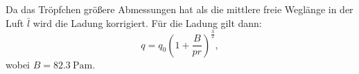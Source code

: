 Da das Tröpfchen größere Abmessungen hat als die mittlere
freie Weglänge in der Luft $\bar{l}$ wird die Ladung korrigiert.
Für die Ladung gilt dann:
\begin{equation}
  q = q_0 \left( 1 + \frac{B}{p r} \right)^{\frac{3}{2}},
\end{equation}
wobei $B = \SI{82.3}{\pascal\meter}$.
